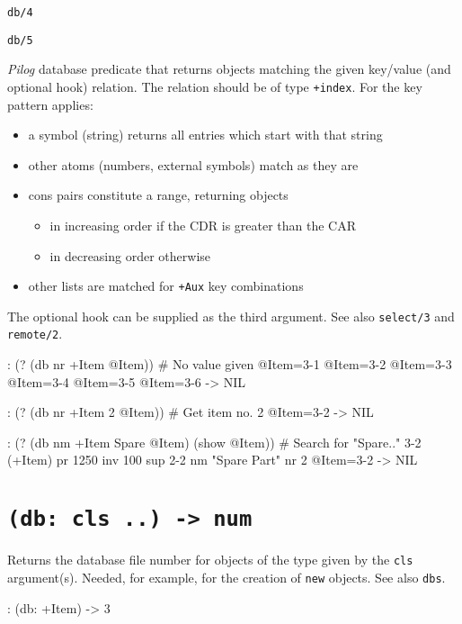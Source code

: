 \texttt{db/4}

\texttt{db/5}

\emph{Pilog} database predicate that returns objects
matching the given key/value (and optional hook) relation. The relation
should be of type \texttt{+index}. For the key pattern applies:

\begin{itemize}
\item a symbol (string) returns all entries which start with that string
\item other atoms (numbers, external symbols) match as they are
\item cons pairs constitute a range, returning objects
\begin{itemize}
\item in increasing order if the CDR is greater than the CAR
\item in decreasing order otherwise
\end{itemize}
\item other lists are matched for \texttt{+Aux} key combinations
\end{itemize}

The optional hook can be supplied as the third argument. See also
\texttt{select/3} and \texttt{remote/2}.


\begin{wideverbatim}
: (? (db nr +Item @Item))              # No value given
 @Item={3-1}
 @Item={3-2}
 @Item={3-3}
 @Item={3-4}
 @Item={3-5}
 @Item={3-6}
-> NIL

: (? (db nr +Item 2 @Item))            # Get item no. 2
 @Item={3-2}
-> NIL

: (? (db nm +Item Spare @Item) (show @Item))  # Search for "Spare.."
{3-2} (+Item)
   pr 1250
   inv 100
   sup {2-2}
   nm "Spare Part"
   nr 2
 @Item={3-2}
-> NIL
\end{wideverbatim}

 
\section*{\texttt{(db: cls ..) -> num}}
\label{sec:func-ref-D-(db: cls ..) -> num}


Returns the database file number for objects of the type given by the
\texttt{cls} argument(s). Needed, for example, for the creation of \texttt{new}
objects. See also \texttt{dbs}.


\begin{wideverbatim}
: (db: +Item)
-> 3
\end{wideverbatim}

